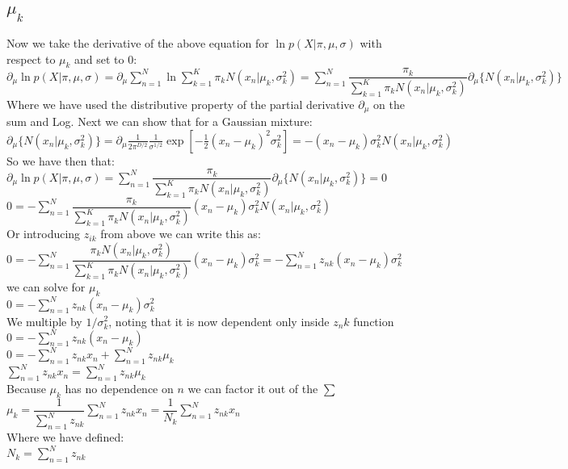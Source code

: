 \documentclass[12pt]{article}
\begin{document}
\subsection{$\mu_k$}

\begin{center}
    Now we take the derivative of the above equation for $\ln p(X|\pi,\mu,\sigma)$ with respect to $\mu_k$ and set to 0:\\
    $\partial_\mu  \ln p(X|\pi,\mu,\sigma) = \partial_\mu  \sum_{n=1}^N \ln   \sum_{k=1}^K \pi_k  N(x_n| \mu_k, \sigma_k^2) = \sum_{n=1}^N \dfrac{\pi_k}{\sum_{k=1}^K \pi_k  N(x_n| \mu_k, \sigma_k^2)} \partial_\mu \{ N(x_n| \mu_k, \sigma_k^2)\}$ \\
    Where we have used the distributive property of the partial derivative $\partial_\mu$ on the sum and Log. Next we can show that for a Gaussian mixture:\\
    $\partial_\mu \{N(x_n| \mu_k, \sigma_k^2)\}= \partial_\mu \frac{1}{2\pi^{D/2}} \frac{1}{\sigma^{1/2}} \exp \left[ -\frac{1}{2} (x_n-\mu_k)^2 \sigma_k^2 \right] = - (x_n-\mu_k) \sigma_k^2  N(x_n| \mu_k, \sigma_k^2)$ \\
    So we have then that: \\
    $\partial_\mu  \ln p(X|\pi,\mu,\sigma) = \sum_{n=1}^N \dfrac{\pi_k}{\sum_{k=1}^K \pi_k  N(x_n| \mu_k, \sigma_k^2)} \partial_\mu \{ N(x_n| \mu_k, \sigma_k^2)\} = 0$ \\ $ 0 =  - \sum_{n=1}^N \dfrac{\pi_k}{\sum_{k=1}^K \pi_k  N(x_n| \mu_k, \sigma_k^2)} (x_n-\mu_k) \sigma_k^2  N(x_n| \mu_k, \sigma_k^2) $ \\
    Or introducing $z_{ik}$ from above we can write this as: \\
    $0 =  - \sum_{n=1}^N \dfrac{\pi_k  N(x_n| \mu_k, \sigma_k^2)}{\sum_{k=1}^K \pi_k  N(x_n| \mu_k, \sigma_k^2)} (x_n-\mu_k) \sigma_k^2  = - \sum_{n=1}^N z_{nk} (x_n-\mu_k) \sigma_k^2 $\\

    we can solve for $\mu_k$\\
    $0=- \sum_{n=1}^N z_{nk} (x_n-\mu_k) \sigma_k^2$\\
    We multiple by $1/\sigma_k^2$, noting that it is now dependent  only inside $z_nk$ function \\
     $0=- \sum_{n=1}^N z_{nk} (x_n-\mu_k)$ \\
     $0=- \sum_{n=1}^N z_{nk}x_n + \sum_{n=1}^N  z_{nk} \mu_k$ \\
      $ \sum_{n=1}^N z_{nk} x_n = \sum_{n=1}^N z_{nk} \mu_k$ \\ 
      Because $\mu_k$ has no dependence on $n$ we can factor it out of the $\sum$
      $\mu_k = \dfrac{1}{\sum_{n=1}^N z_{nk}} \sum_{n=1}^N z_{nk} x_n = \dfrac{1}{N_k} \sum_{n=1}^N z_{nk} x_n$ \\
      Where we have defined:\\
      $N_k = \sum_{n=1}^N z_{nk} $
\end{center}
\end{document}
